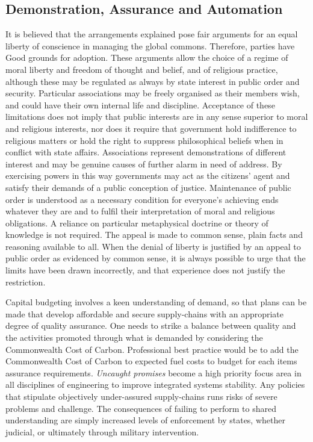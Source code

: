 \documentclass[11pt, oneside]{article}   	%
\begin{document}
\subsection{Demonstration, Assurance and Automation}
It is believed that the arrangements explained pose fair arguments for an equal liberty of conscience in managing the global commons.
Therefore, parties have Good grounds for adoption.
These arguments allow the choice of a regime of moral liberty and freedom of thought and belief, and of religious practice, although these may be regulated as always by state interest in public order and security.
Particular associations may be freely organised as their members wish, and could have their own internal life and discipline.
Acceptance of these limitations does not imply that public interests are in any sense superior to moral and religious interests, nor does it require that government hold indifference to religious matters or hold the right to suppress philosophical beliefs when in conflict with state affairs.
Associations represent demonstrations of different interest and may be genuine causes of further alarm in need of address.
By exercising powers in this way governments may act as the citizens' agent and satisfy their demands of a public conception of justice.
Maintenance of public order is understood as a necessary condition for everyone's achieving ends whatever they are and to fulfil their interpretation of moral and religious obligations.
A reliance on particular metaphysical doctrine or theory of knowledge is not required.
The appeal is made to common sense, plain facts and reasoning available to all.
When the denial of liberty is justified by an appeal to public order as evidenced by common sense, it is always possible to urge that the limits have been drawn incorrectly, and that experience does not justify the restriction.\

Capital budgeting involves a keen understanding of demand, so that plans can be made that develop affordable and secure supply-chains with an appropriate degree of quality assurance.
One needs to strike a balance between quality and the activities promoted through what is demanded by considering the Commonwealth Cost of Carbon.
Professional best practice would be to add the Commonwealth Cost of Carbon to expected fuel costs to budget for each items assurance requirements.
\emph{Uncaught promises} become a high priority focus area in all disciplines of engineering to improve integrated systems stability.
Any policies that stipulate objectively under-assured supply-chains runs risks of severe problems and challenge.
The consequences of failing to perform to shared understanding are simply increased levels of enforcement by states, whether judicial, or ultimately through military intervention.\
\end{document}
